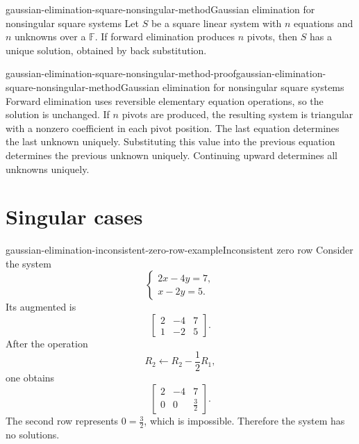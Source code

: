\documentclass[preview]{standalone}
\begin{document}
\begin{snippetproposition}{gaussian-elimination-square-nonsingular-method}{Gaussian elimination for nonsingular square systems}
    Let \(S\) be a square linear system with \(n\) equations and \(n\)
    unknowns over a \field \(\mathbb{F}\). If forward elimination produces
    \(n\) pivots, then \(S\) has a unique solution, obtained by back
    substitution.
\end{snippetproposition}

\begin{snippetproof}{gaussian-elimination-square-nonsingular-method-proof}{gaussian-elimination-square-nonsingular-method}{Gaussian elimination for nonsingular square systems}
    Forward elimination uses reversible elementary equation operations, so the
    solution \set is unchanged. If \(n\) pivots are produced, the resulting
    system is triangular with a nonzero coefficient in each pivot position.
    The last equation determines the last unknown uniquely. Substituting this
    value into the previous equation determines the previous unknown uniquely.
    Continuing upward determines all unknowns uniquely.
\end{snippetproof}

\section{Singular cases}

\begin{snippetexample}{gaussian-elimination-inconsistent-zero-row-example}{Inconsistent zero row}
    Consider the system
    \[
        \begin{cases}
            2x-4y=7,\\
            x-2y=5.
        \end{cases}
    \]
    Its augmented \matrix is
    \[
        \left[
            \begin{array}{cc|c}
                2 & -4 & 7\\
                1 & -2 & 5
            \end{array}
        \right].
    \]
    After the operation
    \[
        R_2\leftarrow R_2-\frac{1}{2}R_1,
    \]
    one obtains
    \[
        \left[
            \begin{array}{cc|c}
                2 & -4 & 7\\
                0 & 0 & \frac{3}{2}
            \end{array}
        \right].
    \]
    The second row represents \(0=\frac{3}{2}\), which is impossible.
    Therefore the system has no solutions.
\end{snippetexample}
\end{document}
